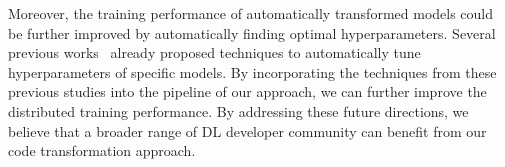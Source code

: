\begin{inred}
Moreover, the training performance of automatically transformed models
could be further improved by automatically finding optimal hyperparameters.
Several previous works~\cite{pmlr-v33-yogatama14}\cite{autohyper-rl}\cite{autotune}
already proposed techniques to automatically tune hyperparameters
of specific models.
By incorporating the techniques from these previous studies into the pipeline of 
our approach, we can further improve the distributed training performance.
By addressing these future directions,
we believe that a broader range of DL developer community can benefit from
our code transformation approach.
\end{inred}






